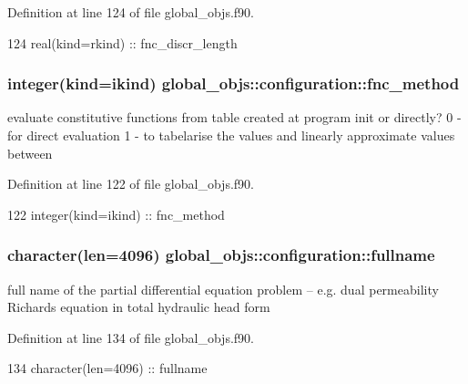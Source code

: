 Definition at line 124 of file global\+\_\+objs.\+f90.


\begin{DoxyCode}
124     \textcolor{keywordtype}{real(kind=rkind)}    :: fnc\_discr\_length
\end{DoxyCode}
\subsubsection[{fnc\+\_\+method}]{\setlength{\rightskip}{0pt plus 5cm}integer(kind=ikind) global\+\_\+objs\+::configuration\+::fnc\+\_\+method}\label{structglobal__objs_1_1configuration_a8e4dd72ef9e89879d8bc081da7a04625}


evaluate constitutive functions from table created at program init or directly? 0 -\/ for direct evaluation 1 -\/ to tabelarise the values and linearly approximate values between 



Definition at line 122 of file global\+\_\+objs.\+f90.


\begin{DoxyCode}
122     \textcolor{keywordtype}{integer(kind=ikind)} :: fnc\_method
\end{DoxyCode}
\subsubsection[{fullname}]{\setlength{\rightskip}{0pt plus 5cm}character(len=4096) global\+\_\+objs\+::configuration\+::fullname}\label{structglobal__objs_1_1configuration_a4146c6107a50785b8705f322040863ab}


full name of the partial differential equation problem -- e.\+g. dual permeability Richards equation in total hydraulic head form 



Definition at line 134 of file global\+\_\+objs.\+f90.


\begin{DoxyCode}
134     \textcolor{keywordtype}{character(len=4096)} :: fullname
\end{DoxyCode}
